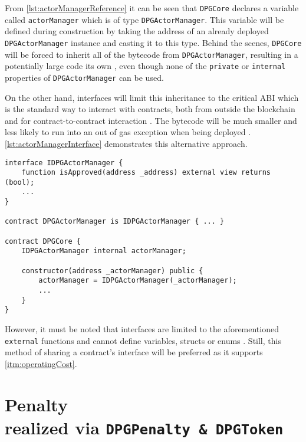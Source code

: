 From \autoref{lst:actorManagerReference} it can be seen that \texttt{DPGCore} declares a variable called \texttt{actorManager} which is of type \texttt{DPGActorManager}. This variable will be defined during construction by taking the address of an already deployed \texttt{DPGActorManager} instance and casting it to this type. Behind the scenes, \texttt{DPGCore} will be forced to inherit all of the bytecode from \texttt{DPGActorManager}, resulting in a potentially large code its own \cite{interfaces}, even though none of the \texttt{private} or \texttt{internal} properties of \texttt{DPGActorManager} can be used. 

On the other hand, interfaces will limit this inheritance to the critical \ac{ABI} which is the standard way to interact with contracts, both from outside the blockchain and for contract-to-contract interaction \cite[pp.~93, 133]{solidityDocs}. The bytecode will be much smaller and less likely to run into an out of gas exception when being deployed \cite{interfaces}. \autoref{lst:actorManagerInterface} demonstrates this alternative approach. 

\pagebreak

\begin{lstlisting}[language=Solidity, caption=Sharing external contract interface via interfaces, label=lst:actorManagerInterface]
interface IDPGActorManager {
	function isApproved(address _address) external view returns (bool);
	...
}

contract DPGActorManager is IDPGActorManager { ... }

contract DPGCore {
	IDPGActorManager internal actorManager;
	
	constructor(address _actorManager) public {
		actorManager = IDPGActorManager(_actorManager);
		...
	}
}
\end{lstlisting}

However, it must be noted that interfaces are limited to the aforementioned \texttt{external} functions and cannot define variables, structs or enums \cite[p.~92]{solidityDocs}. Still, this method of sharing a contract's interface will be preferred as it supports \ref{itm:operatingCost}.

\pagebreak

\section[Penalty]{Penalty \\ {\normalsize realized via \texttt{DPGPenalty \& DPGToken}}}


